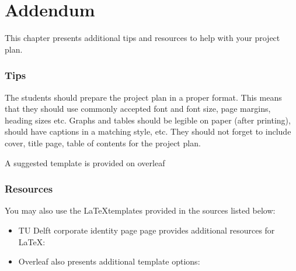 \chapter{Addendum}
This chapter presents additional tips and resources to help with your project plan.
\subsection{Tips}
The students should prepare the project plan in a proper format. This means that they should use commonly accepted font and font size, page margins, heading sizes etc. Graphs and tables should be legible on paper (after printing), should have captions in a matching style, etc. They should not forget to include cover, title page, table of contents for the project plan.\par 
A suggested template is provided on overleaf  \href{https://www.overleaf.com/read/zxtxvxpcsdrr
}{\color{tudelft-cyan}{https://www.overleaf.com/read/zxtxvxpcsdrr
}}

\subsection{Resources}
You may also use the  \LaTeX templates provided in the sources listed below:
\begin{itemize}
    \item TU Delft corporate identity page page provides additional resources for \LaTeX: \\ \href{https://www.tudelft.nl/huisstijl/downloads}{\color{tudelft-cyan}{www.tudelft.nl/huisstijl/downloads}}
    \item Overleaf also presents additional template options: \href{https://www.overleaf.com/edu/tudelft#templates}{\color{tudelft-cyan}{www.overleaf.com/edu/tudelft\#templates}}
\end{itemize}